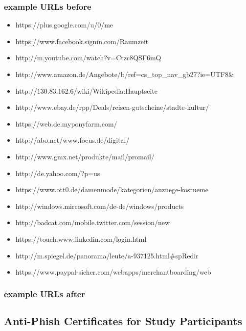 \subsubsection{example URLs before}
\label{example_urls_before}
\begin{itemize}
\item https://plus.google.com/u/0/me
\item https://www.facebook.signin.com/Raumzeit
\item http://m.youtube.com/watch?v=Ctzc8QSF6mQ
\item http://www.amazon.de/Angebote/b/ref=cs_top_nav_gb27?ie=UTF8\&
\item http://130.83.162.6/wiki/Wikipedia:Hauptseite
\item http://www.ebay.de/rpp/Deals/reisen-gutscheine/stadte-kultur/
\item https://web.de.myponyfarm.com/
\item http://abo.net/www.focus.de/digital/
\item http://www.gmx.net/produkte/mail/promail/
\item http://de.yahoo.com/?p=us
\item https://www.ott0.de/damenmode/kategorien/anzuege-kostueme
\item http://windows.mircosoft.com/de-de/windows/products
\item http://badcat.com/mobile.twitter.com/session/new
\item https://touch.www.linkedin.com/login.html
\item http://m.spiegel.de/panorama/leute/a-937125.html#spRedir
\item https://www.paypal-sicher.com/webapps/merchantboarding/web
\end{itemize}


\subsubsection{example URLs after}
\label{example_urls_after}

\subsection{Anti-Phish Certificates for Study Participants}
\label{s:antiphish_certs}



